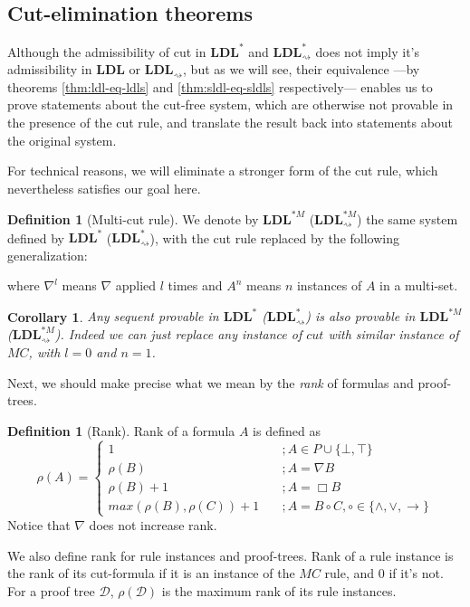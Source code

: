 \documentclass[12pt,a4paper]{article}
\theoremstyle{plain}
\newtheorem{cor}[thm]{Corollary}
\theoremstyle{definition}
\newtheorem{dfn}[thm]{Definition}
\begin{document}
\subsection{Cut-elimination theorems}
Although the admissibility of cut in $\mathbf{LDL}^*$ and $\mathbf{LDL}^*_{\rightsquigarrow}$ does not imply it's admissibility in $\mathbf{LDL}$ or $\mathbf{LDL}_{\rightsquigarrow}$, but as we will see, their equivalence ---by theorems \ref{thm:ldl-eq-ldls} and \ref{thm:sldl-eq-sldls} respectively--- enables us to prove statements about the cut-free system, which are otherwise not provable in the presence of the cut rule, and translate the result back into statements about the original system.

For technical reasons, we will eliminate a stronger form of the cut rule, which nevertheless satisfies our goal here.

\begin{dfn}[Multi-cut rule] We denote by $\mathbf{LDL}^{*M}$ ($\mathbf{LDL}^{*M}_{\rightsquigarrow}$) the same system defined by $\mathbf{LDL}^*$ ($\mathbf{LDL}^*_{\rightsquigarrow}$), with the cut rule replaced by the following generalization:
\begin{prooftree}
\end{prooftree}
where $\nabla^l$ means $\nabla$ applied $l$ times and $A^n$ means $n$ instances of $A$ in a multi-set.
\end{dfn}

\begin{cor}\label{cor:mc-riddance} Any sequent provable in $\mathbf{LDL}^*$ ($\mathbf{LDL}^*_{\rightsquigarrow}$) is also provable in $\mathbf{LDL}^{*M}$ ($\mathbf{LDL}^{*M}_{\rightsquigarrow}$). Indeed we can just replace any instance of $cut$ with similar instance of $MC$, with $l = 0$ and $n = 1$.
\end{cor}

Next, we should make precise what we mean by the \emph{rank} of formulas and proof-trees.

\begin{dfn}[Rank]
	Rank of a formula $A$ is defined as
	\[ \rho(A) = \begin{cases}
	1 & \quad ; A \in P \cup \{ \bot, \top \} \\
	\rho(B) & \quad ; A = \nabla B \\
	\rho(B) + 1 & \quad ; A = \Box B \\
	max(\rho(B), \rho(C)) + 1 & \quad ; A = B \circ C, \circ \in \{ \land , \lor, \rightarrow \}
	\end{cases} \]
	Notice that $\nabla$ does not increase rank.
	
	We also define rank for rule instances and proof-trees. Rank of a rule instance is the rank of its cut-formula if it is an instance of the $MC$ rule, and $0$ if it's not.
	For a proof tree $\mathcal{D}$, $\rho(\mathcal{D})$ is the maximum rank of its rule instances.
\end{dfn}
\end{document}
